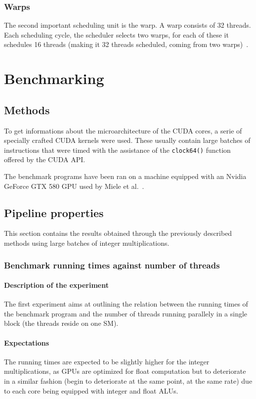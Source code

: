 \documentclass{report}
\begin{document}
        \subsection{Warps}
        The second important scheduling unit is the warp. A warp consists
        of 32 threads. Each scheduling cycle, the scheduler selects two
        warps, for each of these it schedules 16 threads (making it 32
        threads scheduled, coming from two warps)~\cite{cudaprog}.

\chapter{Benchmarking}

\section{Methods}
	To get informations about the microarchitecture of the CUDA cores, a serie 
    of specially crafted CUDA kernels were used. These usually contain large 
    batches of instructions that were timed with the assistance of the \texttt{clock64()} 
    function offered by the CUDA API.

	The benchmark programs have been ran on a machine equipped with an Nvidia
    GeForce GTX 580 GPU used by Miele et al.~\cite{cofact14}.

\section{Pipeline properties}
	This section contains the results obtained through the previously described
	methods using large batches of integer multiplications.

	\subsection{Benchmark running times against number of threads}
	\label{par:pipeline_exp}
	\subsubsection{Description of the experiment}
	The first experiment aims at outlining the relation between the running
    times of the benchmark program and the number of threads running parallely in
    a single block (the threads reside on one SM).
	\subsubsection{Expectations}
    The running times are expected to be slightly higher for the integer
    multiplications, as GPUs are optimized for float computation
    but to deteriorate in a similar fashion (begin to deteriorate
    at the same point, at the same rate) due to each core being equipped with
    integer and float ALUs.
    
\end{document}
